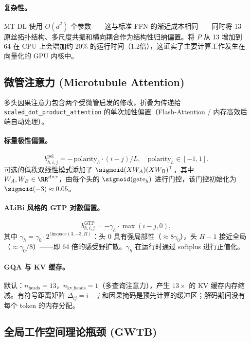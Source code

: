 \paragraph{复杂性。}
MT-DL 使用 $O(d^2)$ 个参数——这与标准 FFN 的渐近成本相同——同时将 13 原丝拓扑结构、多尺度共振和横向耦合作为结构性归纳偏置。将 $P$ 从 13 增加到 64 在 CPU 上会增加约 20\% 的运行时间（1.2倍），这证实了主要计算工作发生在向量化的 GPU 内核中。

\subsection{微管注意力 (Microtubule Attention)}
\label{sec:attn}

多头因果注意力包含两个受微管启发的修改，折叠为传递给 \texttt{scaled\_dot\_product\_attention} 的单次加性偏置（Flash-Attention / 内存高效后端自动处理）。

\paragraph{标量极性偏置。}
\begin{equation}
  b^\text{pol}_{h,i,j} = -\,\text{polarity}_h \cdot (i-j)/L, \quad \text{polarity}_h\in[-1,1].
\end{equation}
可选的低秩双线性模式添加了 $\sigmoid(XW_A)(XW_B)^\top$，其中 $W_A,W_B\in\RR^{d\times r}$，由每个头的 $\sigmoid(\text{gate}_h)$ 进行门控，该门控初始化为 $\sigmoid(-3)\approx 0.05$。

\paragraph{ALiBi 风格的 GTP 对数偏置。}
\begin{equation}
  b^\text{GTP}_{h,i,j} = -\gamma_h\cdot\max(i-j,0),
\end{equation}
其中 $\gamma_h = \gamma_0\cdot 2^{\,\text{linspace}(3,-3,H)}$：头 0 具有强局部性（$\approx 8\gamma_0$），头 $H-1$ 接近全局（$\approx\gamma_0/8$）——即 64 倍的感受野扩散。$\gamma_h$ 在运行时通过 softplus 进行正值化。

\paragraph{GQA 与 KV 缓存。}
默认：$n_\text{heads}=13$，$n_\text{kv\_heads}=1$（多查询注意力），产生 $13\times$ 的 KV 缓存内存缩减。有符号距离矩阵 $\Delta_{ij}=i-j$ 和因果掩码是预先计算的缓冲区；解码期间没有每个 token 的内存分配。

\subsection{全局工作空间理论瓶颈 (GWTB)}
\label{sec:gwtb}

